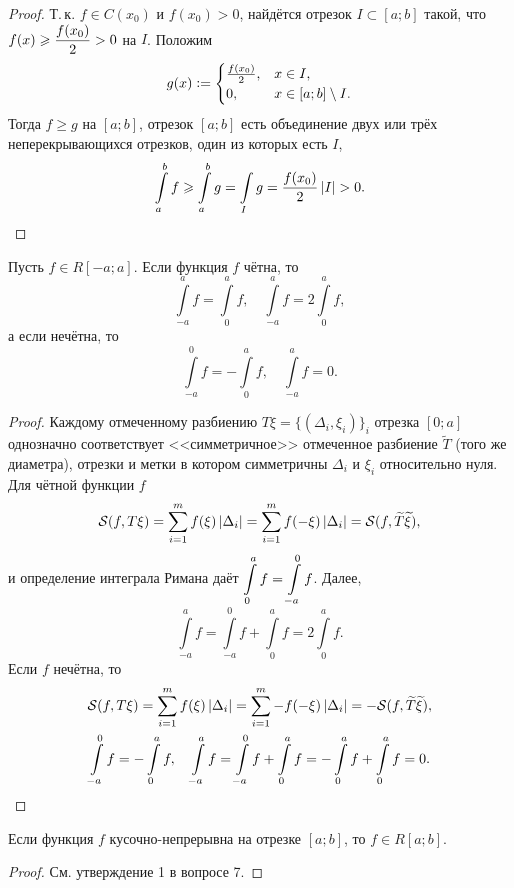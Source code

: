 \begin{proof}
    Т.\,к. $f \in C(x_0)$ и $f(x_0) > 0$, найдётся отрезок $I \subset [a; b]$ такой, что $\displaystyle f(x) \geqslant \frac{f(x_0)}{2} > 0$ на $I$. Положим
    \[
        g(x) \vcentcolon =
        \begin{cases}
            \frac{f(x_0)}{2},& x \in I,\\
            0,& x \in [a; b] \setminus I.
        \end{cases}
    \]
    Тогда $f \geqslant g$ на $[a; b]$, отрезок $[a; b]$ есть объединение двух или трёх неперекрывающихся отрезков, один из которых есть $I$,
    \[
        \int\limits_a^bf \geqslant \int\limits_a^bg = \int\limits_Ig = \frac{f(x_0)}{2}\left\lvert I\right\rvert > 0.
    \]
\end{proof}

\begin{theorem}
    Пусть $f \in R[-a; a]$. Если функция $f$ чётна, то
    \[
        \int\limits_{-a}^af = \int\limits_0^af,\quad\int\limits_{-a}^af = 2\int\limits_0^af,
    \]
    а если нечётна, то
    \[
        \int\limits_{-a}^0f = -\int\limits_0^af,\quad\int\limits_{-a}^af = 0.
    \]
\end{theorem}

\begin{proof}
    Каждому отмеченному разбиению  $T\xi = \{(\Delta_i, \xi_i)\}_i$ отрезка $[0; a]$ однозначно соответствует <<симметричное>> отмеченное разбиение $\widetilde{T}$ (того же диаметра), отрезки и метки в котором симметричны $\Delta_i$ и $\xi_i$ относительно нуля. Для чётной функции $f$
    \[
        \mathcal{S}(f, T\xi) = \sum_{i = 1}^mf(\xi)\left\lvert\Delta_i\right\rvert = \sum_{i = 1}^mf(-\xi)\left\lvert\Delta_i\right\rvert = \mathcal{S}(f, \widetilde{T}\widetilde{\xi}),
    \]
    и определение интеграла Римана даёт $\displaystyle\int\limits_0^af = \int\limits_{-a}^0f$. Далее,
    \[
        \int\limits_{-a}^af = \int\limits_{-a}^0f + \int\limits_0^af = 2\int\limits_0^af.
    \]
    Если $f$ нечётна, то
    \begin{gather*}
        \mathcal{S}(f, T\xi) = \sum_{i = 1}^mf(\xi)\left\lvert\Delta_i\right\rvert = \sum_{i = 1}^m-f(-\xi)\left\lvert\Delta_i\right\rvert = -\mathcal{S}(f, \widetilde{T}\widetilde{\xi}),\\
        \int\limits_{-a}^0f = -\int\limits_0^af,\quad\int\limits_{-a}^af = \int\limits_{-a}^0f + \int\limits_0^af = -\int\limits_0^af + \int\limits_0^af = 0.
    \end{gather*}
\end{proof}

\begin{theorem}
    Если функция $f$ кусочно-непрерывна на отрезке $[a; b]$, то $f \in R[a; b]$.
\end{theorem}

\begin{proof}
    См. утверждение 1 в вопросе 7.
\end{proof}

